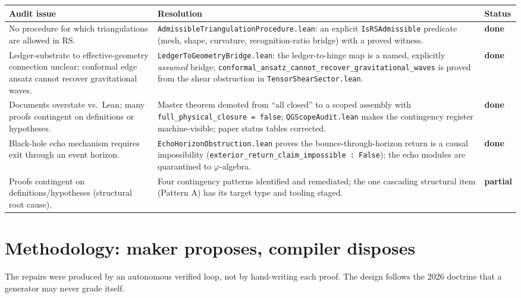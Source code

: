 \documentclass[11pt,letterpaper]{article}
\newcommand{\lmod}[1]{\texttt{#1}}
\newcommand{\sdone}{{\color{green!55!black}\textbf{done}}}
\newcommand{\spart}{{\color{orange!85!black}\textbf{partial}}}
\begin{document}
\begin{center}
\footnotesize
\renewcommand{\arraystretch}{1.3}
\begin{tabular}{p{5.4cm}p{7.2cm}l}
\toprule
\textbf{Audit issue} & \textbf{Resolution} & \textbf{Status} \\
\midrule
No procedure for which triangulations are allowed in RS.
& \lmod{AdmissibleTriangulationProcedure.lean}: an explicit
\texttt{IsRSAdmissible} predicate (mesh, shape, curvature, recognition-ratio
bridge) with a proved witness. & \sdone \\
Ledger-substrate to effective-geometry connection unclear; conformal edge ansatz
cannot recover gravitational waves.
& \lmod{LedgerToGeometryBridge.lean}: the ledger-to-hinge map is a named, explicitly
\emph{assumed} bridge; \texttt{conformal\_ansatz\_cannot\_recover\_gravitational\_waves}
is proved from the shear obstruction in \lmod{TensorShearSector.lean}. & \sdone \\
Documents overstate vs.\ Lean; many proofs contingent on definitions or
hypotheses.
& Master theorem demoted from ``all closed'' to a scoped assembly with
\texttt{full\_physical\_closure = false}; \lmod{QGScopeAudit.lean} makes the
contingency register machine-visible; paper status tables corrected. & \sdone \\
Black-hole echo mechanism requires exit through an event horizon.
& \lmod{EchoHorizonObstruction.lean} proves the bounce-through-horizon return is a
causal impossibility (\texttt{exterior\_return\_claim\_impossible : False}); the
echo modules are quarantined to $\varphi$-algebra. & \sdone \\
Proofs contingent on definitions/hypotheses (structural root cause).
& Four contingency patterns identified and remediated; the one cascading
structural item (Pattern A) has its target type and tooling staged. & \spart \\
\bottomrule
\end{tabular}
\end{center}

\section{Methodology: maker proposes, compiler disposes}
\label{sec:method}

The repairs were produced by an autonomous verified loop, not by hand-writing
each proof. The design follows the 2026 doctrine that a generator may never grade
itself.
\end{document}
